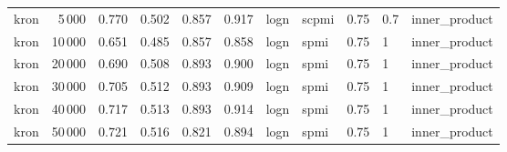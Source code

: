 \begin{tabular}{lrrrrrlllll}
    kron &            5\,000 &  0.770 &  0.502 &      0.857 &          0.917 &  logn &  scpmi &    0.75 &  0.7 &  inner\_product \\
    kron &           10\,000 &  0.651 &  0.485 &      0.857 &          0.858 &  logn &   spmi &    0.75 &    1 &  inner\_product \\
    kron &           20\,000 &  0.690 &  0.508 &      0.893 &          0.900 &  logn &   spmi &    0.75 &    1 &  inner\_product \\
    kron &           30\,000 &  0.705 &  0.512 &      0.893 &          0.909 &  logn &   spmi &    0.75 &    1 &  inner\_product \\
    kron &           40\,000 &  0.717 &  0.513 &      0.893 &          0.914 &  logn &   spmi &    0.75 &    1 &  inner\_product \\
    kron &           50\,000 &  0.721 &  0.516 &      0.821 &          0.894 &  logn &   spmi &    0.75 &    1 &  inner\_product \\
\bottomrule
\end{tabular}
